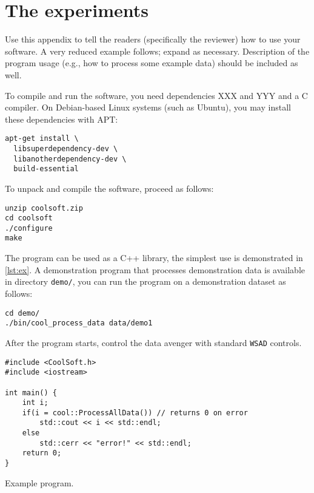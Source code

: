 \chapter{The experiments}
\label{chap:analyzer}

Use this appendix to tell the readers (specifically the reviewer) how to use your software. A very reduced example follows; expand as necessary. Description of the program usage (e.g., how to process some example data) should be included as well.

To compile and run the software, you need dependencies XXX and YYY and a C compiler. On Debian-based Linux systems (such as Ubuntu), you may install these dependencies with APT:
\begin{Verbatim}
apt-get install \
  libsuperdependency-dev \
  libanotherdependency-dev \
  build-essential
\end{Verbatim}

To unpack and compile the software, proceed as follows:
\begin{Verbatim}
unzip coolsoft.zip
cd coolsoft
./configure
make
\end{Verbatim}

The program can be used as a C++ library, the simplest use is demonstrated in \cref{lst:ex}. A demonstration program that processes demonstration data is available in directory \verb|demo/|, you can run the program on a demonstration dataset as follows:
\begin{Verbatim}
cd demo/
./bin/cool_process_data data/demo1
\end{Verbatim}

After the program starts, control the data avenger with standard \verb-WSAD- controls.

\begin{listing}
\begin{lstlisting}
#include <CoolSoft.h>
#include <iostream>

int main() {
	int i;
	if(i = cool::ProcessAllData()) // returns 0 on error
		std::cout << i << std::endl;
	else
		std::cerr << "error!" << std::endl;
	return 0;
}
\end{lstlisting}
\caption{Example program.}
\label{lst:ex}
\end{listing}
